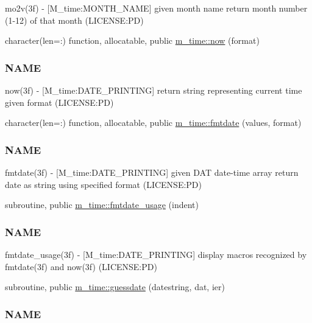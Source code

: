 \begin{DoxyCompactItemize}
\begin{DoxyCompactList}
mo2v(3f) -\/ \mbox{[}M\+\_\+time\+:M\+O\+N\+T\+H\+\_\+\+N\+A\+ME\mbox{]} given month name return month number (1-\/12) of that month (L\+I\+C\+E\+N\+SE\+:PD) \end{DoxyCompactList}\item 
character(len=\+:) function, allocatable, public \mbox{\hyperlink{namespacem__time_a6b5e87be0e510ff268c1ecfbf67a3bdb}{m\+\_\+time\+::now}} (format)
\begin{DoxyCompactList}\small\item\em \subsubsection*{N\+A\+ME}

now(3f) -\/ \mbox{[}M\+\_\+time\+:D\+A\+T\+E\+\_\+\+P\+R\+I\+N\+T\+I\+NG\mbox{]} return string representing current time given format (L\+I\+C\+E\+N\+SE\+:PD) \end{DoxyCompactList}\item 
character(len=\+:) function, allocatable, public \mbox{\hyperlink{namespacem__time_a2cb84c9b8af4f395b76aed76e1431328}{m\+\_\+time\+::fmtdate}} (values, format)
\begin{DoxyCompactList}\small\item\em \subsubsection*{N\+A\+ME}

fmtdate(3f) -\/ \mbox{[}M\+\_\+time\+:D\+A\+T\+E\+\_\+\+P\+R\+I\+N\+T\+I\+NG\mbox{]} given D\+AT date-\/time array return date as string using specified format (L\+I\+C\+E\+N\+SE\+:PD) \end{DoxyCompactList}\item 
subroutine, public \mbox{\hyperlink{namespacem__time_a914927f70fb9495af1be2e484b967111}{m\+\_\+time\+::fmtdate\+\_\+usage}} (indent)
\begin{DoxyCompactList}\small\item\em \subsubsection*{N\+A\+ME}

fmtdate\+\_\+usage(3f) -\/ \mbox{[}M\+\_\+time\+:D\+A\+T\+E\+\_\+\+P\+R\+I\+N\+T\+I\+NG\mbox{]} display macros recognized by fmtdate(3f) and now(3f) (L\+I\+C\+E\+N\+SE\+:PD) \end{DoxyCompactList}\item 
subroutine, public \mbox{\hyperlink{namespacem__time_aa5198c7aa4f3d8411c8ce93046ce3794}{m\+\_\+time\+::guessdate}} (datestring, dat, ier)
\begin{DoxyCompactList}\small\item\em \subsubsection*{N\+A\+ME}


\end{DoxyCompactList}
\end{DoxyCompactItemize}
